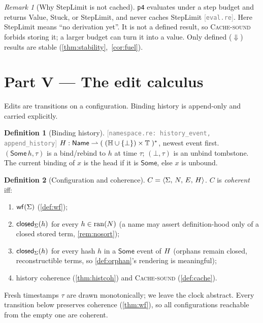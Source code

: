 \documentclass[11pt]{article}
\theoremstyle{definition}
\newtheorem{definition}{Definition}[section]
\theoremstyle{plain}
\theoremstyle{remark}
\newtheorem{remark}{Remark}[section]
\newcommand{\src}[1]{{\footnotesize\textcolor{gray}{[\texttt{#1}]}}}
\begin{document}
\begin{remark}[Why \textsf{StepLimit} is not cached]\label{rem:nostepcache}
\texttt{p4} evaluates under a step budget and returns \textsf{Value}, \textsf{Stuck}, or
\textsf{StepLimit}, and never caches \textsf{StepLimit} \src{eval.re}. Here
\textsf{StepLimit} means ``no derivation yet''. It is not a defined result, so
\textsc{Cache-sound} forbids storing it; a larger budget can turn it into a value. Only defined
($\Downarrow$) results are stable (\cref{thm:stability},~\cref{cor:fuel}).
\end{remark}

\section{Part V --- The edit calculus}\label{sec:edit}

Edits are transitions on a configuration. Binding history is append-only and carried
explicitly.

\begin{definition}[Binding history]\label{def:history}
\src{namespace.re: history\_event, append\_history} $H : \mathsf{Name} \rightharpoonup (\;(\mathbb{H} \cup
\{\bot\}) \times \mathbb{T}\;)^{*}$, newest event first. $(\mathsf{Some}\,h,\tau)$ is a bind/rebind to
$h$ at time $\tau$; $(\bot,\tau)$ is an unbind tombstone. The current binding of $x$ is the head
if it is $\mathsf{Some}$, else $x$ is unbound.
\end{definition}

\begin{definition}[Configuration and coherence]\label{def:config}
$C = \langle \Sigma,\, N,\, E,\, H\rangle$. $C$ is \emph{coherent} iff:
\begin{enumerate}[nosep,label=(\alph*)]
  \item $\mathsf{wf}(\Sigma)$ (\cref{def:wf});
  \item $\mathsf{closed}_{\Sigma}(h)$ for every $h \in \operatorname{ran}(N)$ (a name may assert
  definition-hood only of a closed stored term, \cref{rem:nosort});
  \item $\mathsf{closed}_{\Sigma}(h)$ for every hash $h$ in a $\mathsf{Some}$ event of $H$
  (orphans remain closed, reconstructible terms, so \cref{def:orphan}'s rendering is
  meaningful);
  \item history coherence (\cref{thm:histcoh}) and \textsc{Cache-sound} (\cref{def:cache}).
\end{enumerate}
Fresh timestamps $\tau$ are drawn monotonically; we leave the clock abstract. Every transition
below preserves coherence (\cref{thm:wf}), so all configurations reachable from the empty one
are coherent.
\end{definition}
\end{document}
